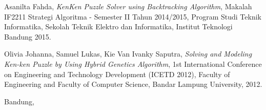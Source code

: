 \documentclass[a4paper,twoside]{article}
\begin{document}
\begin{thebibliography}{9}

  Asanilta Fahda,
  \emph{KenKen Puzzle Solver using Backtracking Algorithm},
  Makalah IF2211 Strategi Algoritma - Semester II Tahun 2014/2015,
  Program Studi Teknik Informatika, Sekolah Teknik Elektro dan Informatika, Institut Teknologi Bandung
  2015.

  Olivia Johanna, Samuel Lukas, Kie Van Ivanky Saputra,
  \emph{Solving and Modeling Ken-ken Puzzle by Using Hybrid Genetics Algorithm},
  1st International Conference on Engineering and Technology Development (ICETD 2012),
  Faculty of Engineering and Faculty of Computer Science, Bandar Lampung University,
  2012.

\end{thebibliography}


\vspace{1cm}
\centering Bandung, \tanggal\\
\vspace{2cm} \nama \\
\vspace{1cm}
\end{document}
